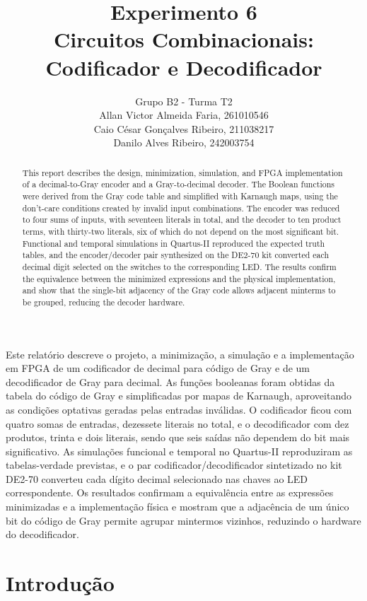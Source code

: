 \documentclass[12pt]{article}
\title{Experimento 6\\ 
Circuitos Combinacionais: Codificador e Decodificador}
\author{Grupo B2 - Turma T2\\   
        Allan Victor Almeida Faria, 261010546\\
        Caio César Gonçalves Ribeiro,  211038217\\
        Danilo Alves Ribeiro,  242003754\\
}
\begin{document}
 
\maketitle

 \begin{abstract}
This report describes the design, minimization, simulation, and FPGA implementation of a decimal-to-Gray encoder and a Gray-to-decimal decoder. The Boolean functions were derived from the Gray code table and simplified with Karnaugh maps, using the don't-care conditions created by invalid input combinations. The encoder was reduced to four sums of inputs, with seventeen literals in total, and the decoder to ten product terms, with thirty-two literals, six of which do not depend on the most significant bit. Functional and temporal simulations in Quartus-II reproduced the expected truth tables, and the encoder/decoder pair synthesized on the DE2-70 kit converted each decimal digit selected on the switches to the corresponding LED. The results confirm the equivalence between the minimized expressions and the physical implementation, and show that the single-bit adjacency of the Gray code allows adjacent minterms to be grouped, reducing the decoder hardware.
 \end{abstract}
 \begin{resumo} 
Este relatório descreve o projeto, a minimização, a simulação e a implementação em FPGA de um codificador de decimal para código de Gray e de um decodificador de Gray para decimal. As funções booleanas foram obtidas da tabela do código de Gray e simplificadas por mapas de Karnaugh, aproveitando as condições optativas geradas pelas entradas inválidas. O codificador ficou com quatro somas de entradas, dezessete literais no total, e o decodificador com dez produtos, trinta e dois literais, sendo que seis saídas não dependem do bit mais significativo. As simulações funcional e temporal no Quartus-II reproduziram as tabelas-verdade previstas, e o par codificador/decodificador sintetizado no kit DE2-70 converteu cada dígito decimal selecionado nas chaves ao LED correspondente. Os resultados confirmam a equivalência entre as expressões minimizadas e a implementação física e mostram que a adjacência de um único bit do código de Gray permite agrupar mintermos vizinhos, reduzindo o hardware do decodificador.
 \end{resumo}


\section{Introdução}
\label{sec:Introducao}
\end{document}
